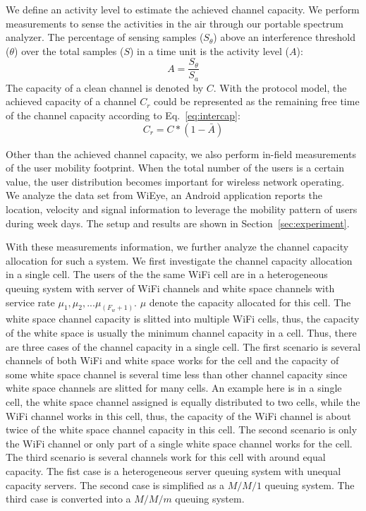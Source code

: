 We define an activity level to estimate the achieved channel capacity. 
We perform measurements to sense the activities in the air through our portable spectrum analyzer.
The percentage of sensing samples ($S_\theta$) above an interference threshold ($\theta$) over the 
total samples ($S$) in a time unit is the activity level ($A$):
\begin{equation}
\label{eq:actdef}
A=\frac{S_\theta}{S_a}
\end{equation}
The capacity of a clean channel is denoted by $C$. With the protocol model, the achieved capacity 
of a channel $C_r$ could be represented as the remaining free time of the channel capacity 
according to Eq.~\ref{eq:intercap}: 
\begin{equation}
\label{eq:intercap}
C_r=C*(1-\bar{A})
\end{equation}

Other than the achieved channel capacity, we also perform in-field measurements of the user mobility footprint. 
When the total number of the users is a certain value, the user distribution becomes important for wireless network 
operating. We analyze the data set from WiEye, an Android application reports the location, velocity and signal 
information to leverage the mobility pattern of users during week days. The setup and results are shown in 
Section~\ref{sec:experiment}.

With these measurements information, we further analyze the channel capacity allocation for such a system. 
We first investigate the channel capacity allocation in a single cell.
The users of the the same WiFi cell are in a heterogeneous queuing system with server of 
WiFi channels and white space channels with service rate $\mu_1,\mu_2,...\mu_{(F_w+1)}$.
$\mu$ denote the capacity allocated for this cell.
The white space channel capacity is slitted into multiple WiFi cells, thus, the 
capacity of the white space is usually the minimum channel capacity in a cell.
Thus, there are three cases of the channel capacity in a single cell. 
The first scenario is several channels of both WiFi and white space works for the cell and the capacity of some 
white space channel is several time less than other channel capacity since white space channels are slitted 
for many cells. 
An example here is in a single cell, the white space channel assigned is equally distributed to two cells, while 
the WiFi channel works in this cell, thus, the capacity of the WiFi channel is about twice of the white space 
channel capacity in this cell.
The second scenario is only the WiFi channel or only part of a single white space channel works 
for the cell. 
The third scenario is several channels work for this cell with around equal capacity.
The fist case is a heterogeneous server queuing system with unequal capacity servers.
The second case is simplified as a $M/M/1$ queuing system. 
The third case is converted into a $M/M/m$ queuing system.

